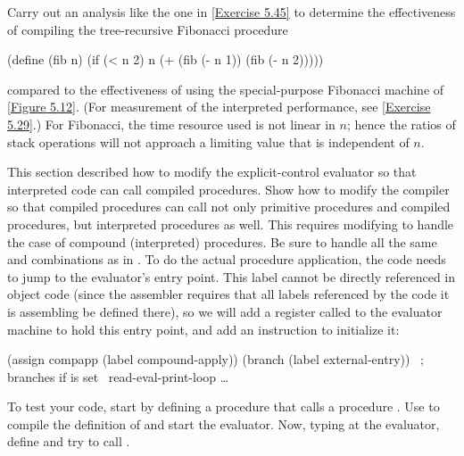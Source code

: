 \begin{exercise}
	\label{Exercise 5.46}
	Carry out an analysis like the one in \cref{Exercise 5.45} to determine the effectiveness of compiling the tree-recursive Fibonacci procedure
	\begin{scheme}
	  (define (fib n)
	    (if (< n 2)
	        n
	        (+ (fib (- n 1))
	          (fib (- n 2)))))
	\end{scheme}
	compared to the effectiveness of using the special-purpose Fibonacci machine of \cref{Figure 5.12}.
	(For measurement of the interpreted performance, see \cref{Exercise 5.29}.)
	For Fibonacci, the time resource used is not linear in \( n \);
	hence the ratios of stack operations will not approach a limiting value that is independent of \( n \).
\end{exercise}



\begin{exercise}
	\label{Exercise 5.47}
	This section described how to modify the explicit-control evaluator so that interpreted code can call compiled procedures.
	Show how to modify the compiler so that compiled procedures can call not only primitive procedures and compiled procedures, but interpreted procedures as well.
	This requires modifying  to handle the case of compound (interpreted) procedures.
	Be sure to handle all the same  and  combinations as in .
	To do the actual procedure application, the code needs to jump to the evaluator’s  entry point.
	This label cannot be directly referenced in object code (since the assembler requires that all labels referenced by the code it is assembling be defined there), so we will add a register called  to the evaluator machine to hold this entry point, and add an instruction to initialize it:
	\begin{scheme}
	   (assign compapp (label compound-apply))
	   (branch (label external-entry)) ~\textrm{; branches if  is set}~
	  read-eval-print-loop …
	\end{scheme}
	To test your code, start by defining a procedure  that calls a procedure .
	Use  to compile the definition of  and start the evaluator.
	Now, typing at the evaluator, define  and try to call .
\end{exercise}



